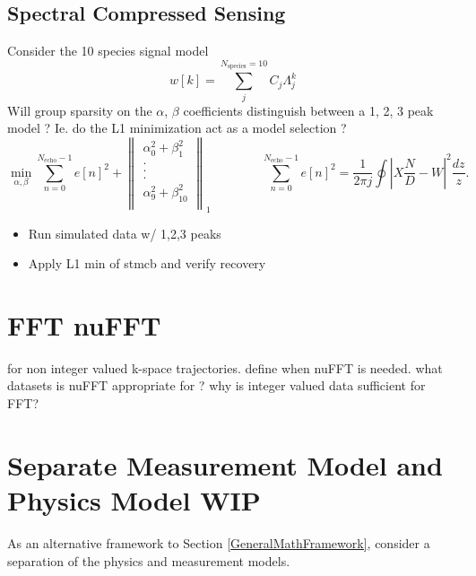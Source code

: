 \documentclass[10pt]{amsart}
\begin{document}
\subsection{Spectral Compressed Sensing} 
Consider the 10 species signal model
\[
 w[k]  = \sum_j^{N_\text{species}=10}  C_j \Lambda_j^k 
\]
Will group sparsity on the $\alpha$, $\beta$ coefficients distinguish between
a 1, 2, 3 peak model ? Ie. do the L1 minimization act as a model selection ? 
\[
\min_{\alpha,\beta} \sum_{n=0}^{N_\text{echo}-1} e[n]^2 + 
\left\|
\begin{matrix}
\alpha_0^2 + \beta_1^2 \\
           .           \\
           .           \\
           .           \\
\alpha_9^2 + \beta_{10}^2 \\
\end{matrix}
\right\|_1
\qquad
\qquad
\sum_{n=0}^{N_\text{echo}-1} e[n]^2 = \frac{1}{2 \pi j} \oint \left| X \frac{N}{D} - W \right|^2 \frac{dz}{z}.
\]
\begin{itemize}
 \item Run simulated data w/ 1,2,3 peaks
 \item Apply L1 min of stmcb and verify recovery
\end{itemize}
\section{FFT nuFFT }

for non integer valued k-space trajectories.
define when nuFFT is needed.
what datasets is nuFFT appropriate for ? 
why is integer valued data sufficient for FFT?

\section{Separate Measurement Model and Physics Model {\color{red} WIP  } }

As an alternative framework to Section \ref{GeneralMathFramework},
consider a separation of the physics and measurement models.
\end{document}

